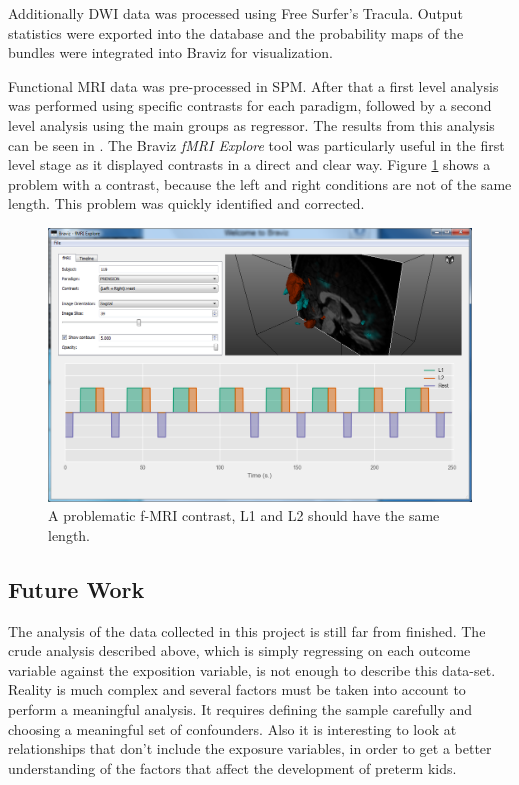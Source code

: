 Additionally DWI data was processed using Free Surfer's Tracula. Output statistics were exported into the database and the probability maps of the bundles were integrated into Braviz for visualization. 

Functional MRI data was pre-processed in SPM.  After that a first level analysis was performed using specific contrasts for each paradigm, followed by a second level analysis using the main groups as regressor. The results from this analysis can be seen in \autocite{PABLO_FELIPE}. The Braviz \emph{fMRI Explore} tool was particularly useful in the first level stage as it displayed contrasts in a direct and clear way. Figure \ref{fig_spm_contrast_error} shows a problem with a contrast, because the left and right conditions are not of the same length. This problem was quickly identified and corrected.

\begin{figure}
	\centering
		\includegraphics{figures/kmc400/erroro_fmri2}
	\caption{A problematic f-MRI contrast, L1 and L2 should have the same length.}
	\label{fig_spm_contrast_error}
\end{figure}
 

\subsection{Future Work}

The analysis of the data collected in this project is still far from finished. The crude analysis described above, which is simply regressing on each outcome variable against the exposition variable, is not enough to describe this data-set. Reality is much complex and several factors must be taken into account to perform a meaningful analysis. It requires defining the sample carefully and choosing a meaningful set of confounders. Also it is interesting to look at relationships that don't include the exposure variables, in order to get a better understanding of the factors that affect the development of preterm kids. 

